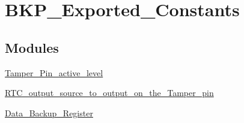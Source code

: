 \hypertarget{group__BKP__Exported__Constants}{
\section{BKP\_\-Exported\_\-Constants}
\label{group__BKP__Exported__Constants}
}
\subsection*{Modules}
\begin{DoxyCompactItemize}
\item 
\hyperlink{group__Tamper__Pin__active__level}{Tamper\_\-Pin\_\-active\_\-level}
\item 
\hyperlink{group__RTC__output__source__to__output__on__the__Tamper__pin}{RTC\_\-output\_\-source\_\-to\_\-output\_\-on\_\-the\_\-Tamper\_\-pin}
\item 
\hyperlink{group__Data__Backup__Register}{Data\_\-Backup\_\-Register}
\end{DoxyCompactItemize}
